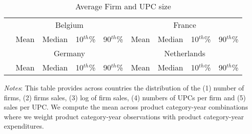 \begin{table}[H]
	\centering		
	\caption{Average Firm and UPC size}
    \label{tab: app_bars_firms_avg_size}
	\begin{spacing}{1.1}
        \begin{tabular}{lrrrrrrrr} \toprule
            & \multicolumn{4}{c}{Belgium} & \multicolumn{4}{c}{France} \\ 
                \cmidrule(lr){2-5} \cmidrule(lr){6-9} 
		     & Mean & Median & 10$^{th}$\% & 90$^{th}$\% & Mean & Median & 10$^{th}$\% & 90$^{th}$\% \\
                \midrule
		    
            & \multicolumn{4}{c}{Germany} & \multicolumn{4}{c}{Netherlands} \\ 
                \cmidrule(lr){2-5} \cmidrule(lr){6-9} 
            & Mean & Median & 10$^{th}$\% & 90$^{th}$\% & Mean & Median & 10$^{th}$\% & 90$^{th}$\% \\ 
                \midrule
           
	    \end{tabular}
    \end{spacing}
    \parbox{\textwidth}{
        \begin{spacing}{1} 
            {\footnotesize 
            \textit{Notes}: This table provides across countries the distribution of the (1) number of firms, (2) firms sales, (3) log of firm sales, (4) numbers of UPCs per firm and (5) sales per UPC. We compute the mean across product category-year combinations where we weight product category-year observations with product category-year expenditures.}
        \end{spacing}}
\end{table}

